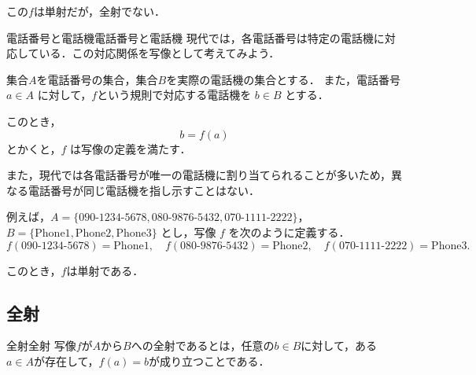 この$f$は単射だが，全射でない．

\begin{example}{電話番号と電話機}{電話番号と電話機}
  現代では，各電話番号は特定の電話機に対応している．この対応関係を写像として考えてみよう．

  集合$A$を電話番号の集合，集合$B$を実際の電話機の集合とする．
  また，電話番号 $a \in A$ に対して，$f$という規則で対応する電話機を $b \in B$ とする．

  このとき，
  \[
    b = f(a)
  \]
  とかくと，$f$ は写像の定義を満たす．

  また，現代では各電話番号が唯一の電話機に割り当てられることが多いため，異なる電話番号が同じ電話機を指し示すことはない．

  例えば，$A = \{\text{090-1234-5678}, \text{080-9876-5432}, \text{070-1111-2222}\}$，
  $B = \{\text{Phone1}, \text{Phone2}, \text{Phone3}\}$ とし，写像 $f$ を次のように定義する．
  \[
    f(\text{090-1234-5678}) = \text{Phone1}, \quad
    f(\text{080-9876-5432}) = \text{Phone2}, \quad
    f(\text{070-1111-2222}) = \text{Phone3}.
  \]

  このとき，$f$は単射である．
\end{example}

\subsection{全射}

\begin{definition}{全射}{全射}
  写像$f$が$A$から$B$への全射であるとは，任意の$b \in B$に対して，ある$a \in A$が存在して，$f(a) = b$が成り立つことである．
\end{definition}

